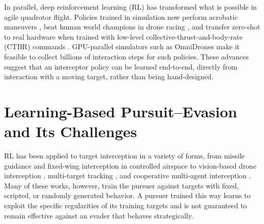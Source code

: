 In parallel, deep reinforcement learning (RL) has transformed what is possible in agile quadrotor flight. Policies trained in simulation now perform acrobatic maneuvers \cite{kaufmannDeepDroneAcrobatics2021}, beat human world champions in drone racing \cite{kaufmannChampionlevelDroneRacing2023a, bahnamMonoRaceWinningChampionLevel2026, boselloYourOwnProLevel2026}, and transfer zero-shot to real hardware when trained with low-level collective-thrust-and-body-rate (CTBR) commands \cite{kaufmannBenchmarkComparisonLearned2022, chenWhatMattersLearning2025a}. GPU-parallel simulators such as OmniDrones \cite{xuOmniDronesEfficientFlexible2023} make it feasible to collect billions of interaction steps for such policies. These advances suggest that an interceptor policy can be learned end-to-end, directly from interaction with a moving target, rather than being hand-designed.

\section{Learning-Based Pursuit--Evasion and Its Challenges}
\noindent
RL has been applied to target interception in a variety of forms, from missile guidance \cite{huInterceptGuidanceManeuvering2023} and fixed-wing interception in controlled airspace \cite{giralInterceptingUnauthorizedAerial2024} to vision-based drone interception \cite{darwishDroneNavigationTarget2023}, multi-target tracking \cite{xiaUAVMultiDynamicTarget2024}, and cooperative multi-agent interception \cite{fanSwitchingawareMultiagentDeep2023, zhangGameDronesMultiUAV2023, chenOnlinePlanningMultiUAV2025}. Many of these works, however, train the pursuer against targets with fixed, scripted, or randomly generated behavior. A pursuer trained this way learns to exploit the specific regularities of its training targets and is not guaranteed to remain effective against an evader that behaves strategically.

